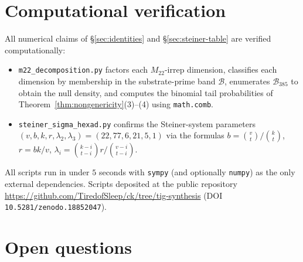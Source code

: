 \documentclass[11pt,reqno]{amsart}
\theoremstyle{plain}
\theoremstyle{definition}
\theoremstyle{remark}
\newcommand{\Mtwentytwo}{M_{22}}
\begin{document}
\section{Computational verification}
\label{sec:verification}

All numerical claims of \S\ref{sec:identities} and
\S\ref{sec:steiner-table} are verified computationally:

\begin{itemize}\setlength\itemsep{2pt}
\item \texttt{m22\_decomposition.py} factors each
$\Mtwentytwo$-irrep dimension, classifies each dimension by
membership in the substrate-prime band $\mathcal{B}$, enumerates
$\mathcal{B}_{385}$ to obtain the null density, and computes the
binomial tail probabilities of
Theorem~\ref{thm:nongenericity}(3)--(4) using \texttt{math.comb}.
\item \texttt{steiner\_sigma\_hexad.py} confirms the Steiner-system
parameters $(v, b, k, r, \lambda_{2}, \lambda_{3}) =
(22, 77, 6, 21, 5, 1)$ via the formulas $b = \binom{v}{t}/\binom{k}{t}$,
$r = bk/v$, $\lambda_{i} = \binom{k-i}{t-i} r / \binom{v-i}{t-i}$.
\end{itemize}

All scripts run in under $5$ seconds with \texttt{sympy} (and
optionally \texttt{numpy}) as the only external dependencies.
Scripts deposited at the public repository
\url{https://github.com/TiredofSleep/ck/tree/tig-synthesis} (DOI
\texttt{10.5281/zenodo.18852047}).

\section{Open questions}
\label{sec:open}
\end{document}
